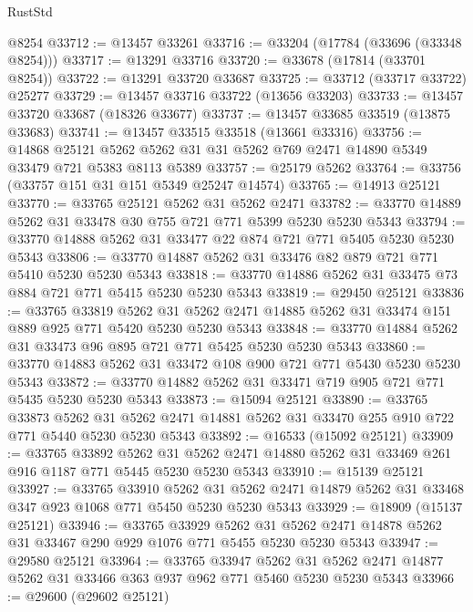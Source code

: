 \begin{lexlean}{RustStd}
\begin{coremodule}
    @8254
@33712 := @13457 @33261
@33716 := @33204 (@17784 (@33696 (@33348 @8254)))
@33717 := @13291 @33716
@33720 := @33678 (@17814 (@33701 @8254))
@33722 := @13291 @33720 @33687
@33725 := @33712 (@33717 @33722) @25277
@33729 := @13457 @33716 @33722 (@13656 @33203)
@33733 := @13457 @33720 @33687 (@18326 @33677)
@33737 := @13457 @33685 @33519 (@13875 @33683)
@33741 := @13457 @33515 @33518 (@13661 @33316)
@33756 := @14868
    @25121
    @5262
    @5262
    @31
    @31
    @5262
    @769
    @2471
    @14890
    @5349
    @33479
    @721
    @5383
    @8113
    @5389
@33757 := @25179 @5262
@33764 := @33756 (@33757 @151 @31 @151 @5349 @25247 @14574)
@33765 := @14913 @25121
@33770 := @33765 @25121 @5262 @31 @5262 @2471
@33782 := @33770 @14889 @5262 @31 @33478 @30 @755 @721 @771 @5399 @5230 @5230 @5343
@33794 := @33770 @14888 @5262 @31 @33477 @22 @874 @721 @771 @5405 @5230 @5230 @5343
@33806 := @33770 @14887 @5262 @31 @33476 @82 @879 @721 @771 @5410 @5230 @5230 @5343
@33818 := @33770 @14886 @5262 @31 @33475 @73 @884 @721 @771 @5415 @5230 @5230 @5343
@33819 := @29450 @25121
@33836 := @33765
    @33819
    @5262
    @31
    @5262
    @2471
    @14885
    @5262
    @31
    @33474
    @151
    @889
    @925
    @771
    @5420
    @5230
    @5230
    @5343
@33848 := @33770 @14884 @5262 @31 @33473 @96 @895 @721 @771 @5425 @5230 @5230 @5343
@33860 := @33770 @14883 @5262 @31 @33472 @108 @900 @721 @771 @5430 @5230 @5230 @5343
@33872 := @33770 @14882 @5262 @31 @33471 @719 @905 @721 @771 @5435 @5230 @5230 @5343
@33873 := @15094 @25121
@33890 := @33765
    @33873
    @5262
    @31
    @5262
    @2471
    @14881
    @5262
    @31
    @33470
    @255
    @910
    @722
    @771
    @5440
    @5230
    @5230
    @5343
@33892 := @16533 (@15092 @25121)
@33909 := @33765
    @33892
    @5262
    @31
    @5262
    @2471
    @14880
    @5262
    @31
    @33469
    @261
    @916
    @1187
    @771
    @5445
    @5230
    @5230
    @5343
@33910 := @15139 @25121
@33927 := @33765
    @33910
    @5262
    @31
    @5262
    @2471
    @14879
    @5262
    @31
    @33468
    @347
    @923
    @1068
    @771
    @5450
    @5230
    @5230
    @5343
@33929 := @18909 (@15137 @25121)
@33946 := @33765
    @33929
    @5262
    @31
    @5262
    @2471
    @14878
    @5262
    @31
    @33467
    @290
    @929
    @1076
    @771
    @5455
    @5230
    @5230
    @5343
@33947 := @29580 @25121
@33964 := @33765
    @33947
    @5262
    @31
    @5262
    @2471
    @14877
    @5262
    @31
    @33466
    @363
    @937
    @962
    @771
    @5460
    @5230
    @5230
    @5343
@33966 := @29600 (@29602 @25121)

\end{coremodule}
\end{lexlean}
